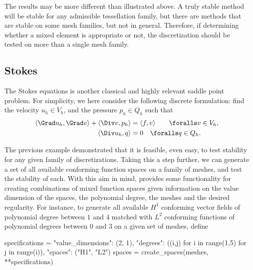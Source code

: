 The results may be more different than illustrated above. A truly
stable method will be stable for any admissible tessellation family,
but there are methods that are stable on some mesh families, but not in
general.  Therefore, if determining whether a mixed element is
appropriate or not, the discretization should be tested on more than a
single mesh family.

\subsection{Stokes}

The Stokes equations is another classical and highly relevant saddle
point problem. For simplicity, we here consider the following discrete
formulation: find the velocity $u_h \in V_h$, and the pressure $p_h
\in Q_h$ such that
\begin{equation}
  \label{rognes:eq:stokes}
  \begin{split}
    \langle \Grad u_h, \Grad v \rangle + \langle \Div v, p_h \rangle &=
    \langle f, v \rangle
    \quad\quad \foralls v \in V_h, \\
    \langle \Div u_h, q \rangle &= 0
    \quad \foralls q \in Q_h.
  \end{split}
\end{equation}

The previous example demonstrated that it is feasible, even easy, to
test stability for any given family of discretizations. Taking this a
step further, we can generate a set of all available conforming
function spaces on a family of meshes, and test the stability of
each. With this aim in mind, \rognesascot{} provides some
functionality for creating combinations of mixed function spaces given
information on the value dimension of the spaces, the polynomial
degree, the meshes and the desired regularity. For instance, to
generate all available $H^1$ conforming vector fields of polynomial
degree between $1$ and $4$ matched with $L^2$ conforming functions of
polynomial degrees between $0$ and $3$ on a given set of meshes,
define
\begin{python}
  specifications = {"value_dimensions": (2, 1),
                    "degrees": ((i,j) for i in range(1,5) for j in range(i)),
                    "spaces": ("H1", "L2")}
  spaces = create_spaces(meshes, **specifications)
\end{python}

